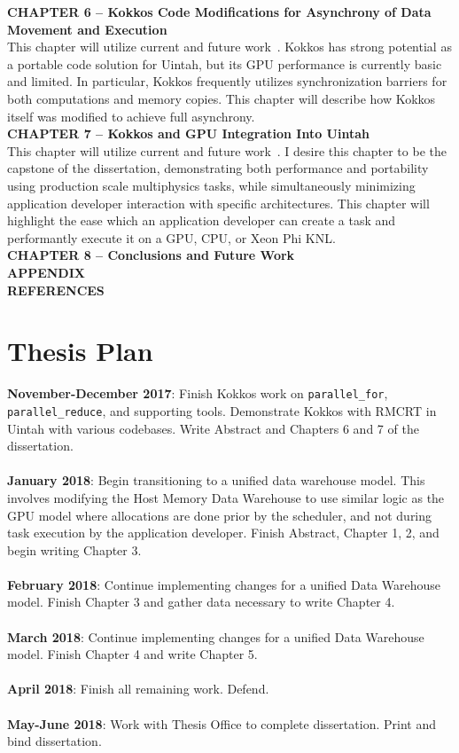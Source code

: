 \documentclass[12pt]{article}
\begin{document}
\textbf{CHAPTER 6 – Kokkos Code Modifications for Asynchrony of Data Movement and Execution}\\
This chapter will utilize current and future work~\cite{espm2-16,jocs18}.  Kokkos has strong potential as a portable code solution for Uintah, but its GPU performance is currently basic and limited.  In particular, Kokkos frequently utilizes synchronization barriers for both computations and memory copies.  This chapter will describe how Kokkos itself was modified to achieve full asynchrony.\\
\textbf{CHAPTER 7 – Kokkos and GPU Integration Into Uintah}\\
This chapter will utilize current and future work~\cite{espm2-16,jocs18}.  I desire this chapter to be the capstone of the dissertation, demonstrating both performance and portability using production scale multiphysics tasks, while simultaneously minimizing application developer interaction with specific architectures.  This chapter will highlight the ease which an application developer can create a task and performantly execute it on a GPU, CPU, or Xeon Phi KNL.  \\  
\textbf{CHAPTER 8 – Conclusions and Future Work}\\
\textbf{APPENDIX}\\
\textbf{REFERENCES}\\

\section{Thesis Plan}
\label{ch:thesis_plan}

\textbf{November-December 2017}: Finish Kokkos work on \texttt{parallel\_for}, \texttt{parallel\_reduce}, and supporting tools.  Demonstrate Kokkos with RMCRT in Uintah with various codebases.  Write Abstract and Chapters 6 and 7 of the dissertation.\\
\\
\textbf{January 2018}: Begin transitioning to a unified data warehouse model.  This involves modifying the Host Memory Data Warehouse to use similar logic as the GPU model where allocations are done prior by the scheduler, and not during task execution by the application developer.  Finish Abstract, Chapter 1, 2, and begin writing Chapter 3.\\
\\
\textbf{February 2018}: Continue implementing changes for a unified Data Warehouse model.  Finish Chapter 3 and gather data necessary to write Chapter 4.\\
\\
\textbf{March 2018}: Continue implementing changes for a unified Data Warehouse model.  Finish Chapter 4 and write Chapter 5.  \\
\\
\textbf{April 2018}: Finish all remaining work.   Defend. \\
\\
\textbf{May-June 2018}: Work with Thesis Office to complete dissertation.  Print and bind dissertation. \\
\end{document}
